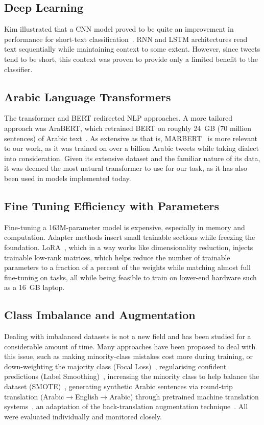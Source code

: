 \documentclass[conference]{IEEEtran}
\begin{document}
\subsection{Deep Learning}
Kim illustrated that a CNN model proved to be quite an improvement in performance for
short-text classification~\cite{kim2014cnn}. RNN and LSTM architectures
read text sequentially while maintaining context to some extent. However, since tweets tend to be short,
this context was proven to provide only a limited benefit to the classifier.

\subsection{Arabic Language Transformers}
The transformer and BERT redirected NLP approaches. A more tailored approach was AraBERT, which retrained
BERT on roughly 24~GB (70 million sentences) of Arabic text~\cite{antoun2020arabert}. As extensive as that is,
MARBERT~\cite{abdulmageed2021marbert} is more relevant to our work, as it was
trained on over a billion Arabic tweets while taking dialect into consideration.
Given its extensive dataset and the familiar nature of its data, it was deemed the most natural
transformer to use for our task, as it has also been used in models implemented today.

\subsection{Fine Tuning Efficiency with Parameters}

Fine-tuning a 163M-parameter model is expensive, especially in memory and computation.
Adapter methods insert small trainable sections while freezing the foundation.
LoRA~\cite{hu2022lora}, which in a way works like dimensionality reduction, injects trainable low-rank
matrices, which helps reduce the number of trainable parameters to a fraction of a percent of the weights
while matching almost full fine-tuning on tasks, all while being feasible to train on lower-end hardware
such as a 16~GB laptop.

\subsection{Class Imbalance and Augmentation}
Dealing with imbalanced datasets is not a new field and has been studied for a
considerable amount of time. Many approaches have been proposed to deal with this issue,
such as making minority-class mistakes cost more
during training, or down-weighting the majority class (Focal Loss)~\cite{lin2017focal},
regularising confident predictions (Label Smoothing)~\cite{muller2019labelsmoothing},
increasing the minority class to help balance the dataset (SMOTE)~\cite{chawla2002smote},
generating synthetic Arabic sentences via round-trip translation (Arabic$\to$English$\to$Arabic)
through pretrained machine translation systems~\cite{tiedemann2020opusmt}, an adaptation of the
back-translation augmentation technique~\cite{sennrich2016backtranslation}.
All were evaluated individually and monitored closely.
\end{document}
